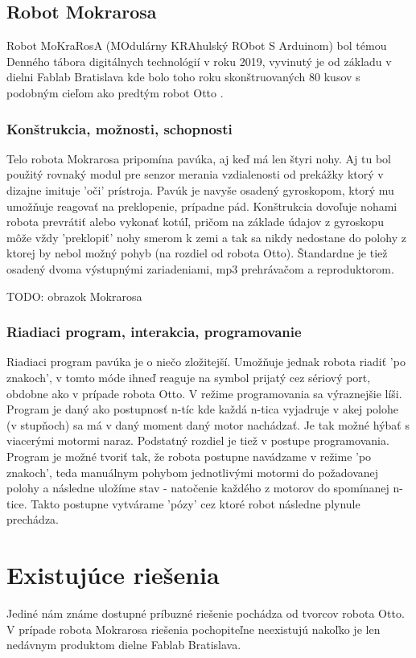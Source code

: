 \subsection{Robot Mokrarosa}
Robot MoKraRosA (MOdulárny KRAhulský RObot S Arduinom) bol témou Denného tábora digitálnych technológií v roku 2019, vyvinutý je od základu v dielni Fablab Bratislava kde bolo toho roku skonštruovaných 80 kusov s podobným cieľom ako predtým robot Otto \cite{Mokrarosa}.

\subsubsection{Konštrukcia, možnosti, schopnosti}
Telo robota Mokrarosa pripomína pavúka, aj keď má len štyri nohy. Aj tu bol použitý rovnaký modul pre senzor merania vzdialenosti od prekážky ktorý v dizajne imituje 'oči' prístroja. Pavúk je navyše osadený gyroskopom, ktorý mu umožňuje reagovať na preklopenie, prípadne pád. Konštrukcia dovoľuje nohami robota prevrátiť alebo vykonať kotúľ, pričom na základe údajov z gyroskopu môže vždy 'preklopiť' nohy smerom k zemi a tak sa nikdy nedostane do polohy z ktorej by nebol možný pohyb (na rozdiel od robota Otto). Štandardne je tiež osadený dvoma výstupnými zariadeniami, mp3 prehrávačom a reproduktorom.

TODO: obrazok Mokrarosa

\subsubsection{Riadiaci program, interakcia, programovanie}
Riadiaci program pavúka je o niečo zložitejší. Umožňuje jednak robota riadiť 'po znakoch', v tomto móde ihneď reaguje na symbol prijatý cez sériový port, obdobne ako v prípade robota Otto. V režime programovania sa výraznejšie líši. Program je daný ako postupnosť n-tíc kde každá n-tica vyjadruje v akej polohe (v stupňoch) sa má v daný moment daný motor nachádzať. Je tak možné hýbať s viacerými motormi naraz. Podstatný rozdiel je tiež v postupe programovania. Program je možné tvoriť tak, že robota postupne navádzame v režime 'po znakoch', teda manuálnym pohybom jednotlivými motormi do požadovanej polohy a následne uložíme stav - natočenie každého z motorov do spomínanej n-tice. Takto postupne vytvárame 'pózy' cez ktoré robot následne plynule prechádza.


\section{Existujúce riešenia}
Jediné nám známe dostupné príbuzné riešenie pochádza od tvorcov robota Otto. V prípade robota Mokrarosa riešenia pochopiteľne neexistujú nakoľko je len nedávnym produktom dielne Fablab Bratislava.

